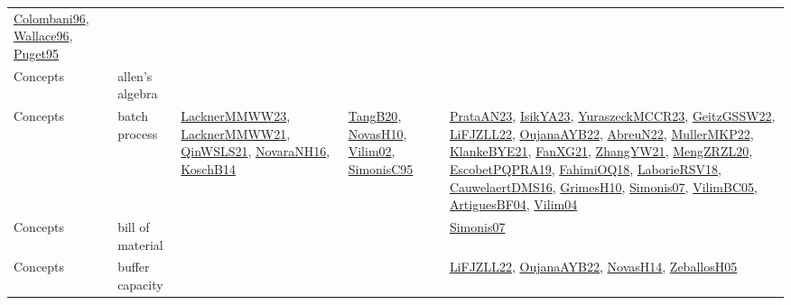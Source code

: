 {\begin{longtable}{llp{6cm}p{6cm}p{6cm}}
\href{papers/Colombani96.pdf}{Colombani96}\cite{Colombani96}, \href{articles/Wallace96.pdf}{Wallace96}\cite{Wallace96}, \href{papers/Puget95.pdf}{Puget95}\cite{Puget95}\\
Concepts & allen's algebra &  &  & \\
Concepts & batch process & \href{articles/LacknerMMWW23.pdf}{LacknerMMWW23}\cite{LacknerMMWW23}, \href{papers/LacknerMMWW21.pdf}{LacknerMMWW21}\cite{LacknerMMWW21}, \href{articles/QinWSLS21.pdf}{QinWSLS21}\cite{QinWSLS21}, \href{articles/NovaraNH16.pdf}{NovaraNH16}\cite{NovaraNH16}, \href{papers/KoschB14.pdf}{KoschB14}\cite{KoschB14} & \href{papers/TangB20.pdf}{TangB20}\cite{TangB20}, \href{articles/NovasH10.pdf}{NovasH10}\cite{NovasH10}, \href{papers/Vilim02.pdf}{Vilim02}\cite{Vilim02}, \href{papers/SimonisC95.pdf}{SimonisC95}\cite{SimonisC95} & \href{articles/PrataAN23.pdf}{PrataAN23}\cite{PrataAN23}, \href{articles/IsikYA23.pdf}{IsikYA23}\cite{IsikYA23}, \href{articles/YuraszeckMCCR23.pdf}{YuraszeckMCCR23}\cite{YuraszeckMCCR23}, \href{papers/GeitzGSSW22.pdf}{GeitzGSSW22}\cite{GeitzGSSW22}, \href{papers/LiFJZLL22.pdf}{LiFJZLL22}\cite{LiFJZLL22}, \href{papers/OujanaAYB22.pdf}{OujanaAYB22}\cite{OujanaAYB22}, \href{articles/AbreuN22.pdf}{AbreuN22}\cite{AbreuN22}, \href{articles/MullerMKP22.pdf}{MullerMKP22}\cite{MullerMKP22}, \href{papers/KlankeBYE21.pdf}{KlankeBYE21}\cite{KlankeBYE21}, \href{articles/FanXG21.pdf}{FanXG21}\cite{FanXG21}, \href{articles/ZhangYW21.pdf}{ZhangYW21}\cite{ZhangYW21}, \href{articles/MengZRZL20.pdf}{MengZRZL20}\cite{MengZRZL20}, \href{articles/EscobetPQPRA19.pdf}{EscobetPQPRA19}\cite{EscobetPQPRA19}, \href{articles/FahimiOQ18.pdf}{FahimiOQ18}\cite{FahimiOQ18}, \href{articles/LaborieRSV18.pdf}{LaborieRSV18}\cite{LaborieRSV18}, \href{papers/CauwelaertDMS16.pdf}{CauwelaertDMS16}\cite{CauwelaertDMS16}, \href{papers/GrimesH10.pdf}{GrimesH10}\cite{GrimesH10}, \href{articles/Simonis07.pdf}{Simonis07}\cite{Simonis07}, \href{articles/VilimBC05.pdf}{VilimBC05}\cite{VilimBC05}, \href{papers/ArtiguesBF04.pdf}{ArtiguesBF04}\cite{ArtiguesBF04}, \href{papers/Vilim04.pdf}{Vilim04}\cite{Vilim04}\\
Concepts & bill of material &  &  & \href{articles/Simonis07.pdf}{Simonis07}\cite{Simonis07}\\
Concepts & buffer capacity &  &  & \href{papers/LiFJZLL22.pdf}{LiFJZLL22}\cite{LiFJZLL22}, \href{papers/OujanaAYB22.pdf}{OujanaAYB22}\cite{OujanaAYB22}, \href{articles/NovasH14.pdf}{NovasH14}\cite{NovasH14}, \href{articles/ZeballosH05.pdf}{ZeballosH05}\cite{ZeballosH05}\\

\end{longtable}}
